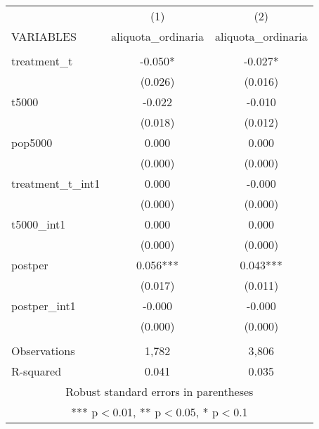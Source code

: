 \documentclass[]{article}
\begin{document}
\begin{tabular}{lcc} \hline
 & (1) & (2) \\
VARIABLES & aliquota\_ordinaria & aliquota\_ordinaria \\ \hline
 &  &  \\
treatment\_t & -0.050* & -0.027* \\
 & (0.026) & (0.016) \\
t5000 & -0.022 & -0.010 \\
 & (0.018) & (0.012) \\
pop5000 & 0.000 & 0.000 \\
 & (0.000) & (0.000) \\
treatment\_t\_int1 & 0.000 & -0.000 \\
 & (0.000) & (0.000) \\
t5000\_int1 & 0.000 & 0.000 \\
 & (0.000) & (0.000) \\
postper & 0.056*** & 0.043*** \\
 & (0.017) & (0.011) \\
postper\_int1 & -0.000 & -0.000 \\
 & (0.000) & (0.000) \\
 &  &  \\
Observations & 1,782 & 3,806 \\
 R-squared & 0.041 & 0.035 \\ \hline
\multicolumn{3}{c}{ Robust standard errors in parentheses} \\
\multicolumn{3}{c}{ *** p$<$0.01, ** p$<$0.05, * p$<$0.1} \\
\end{tabular}
\end{document}
